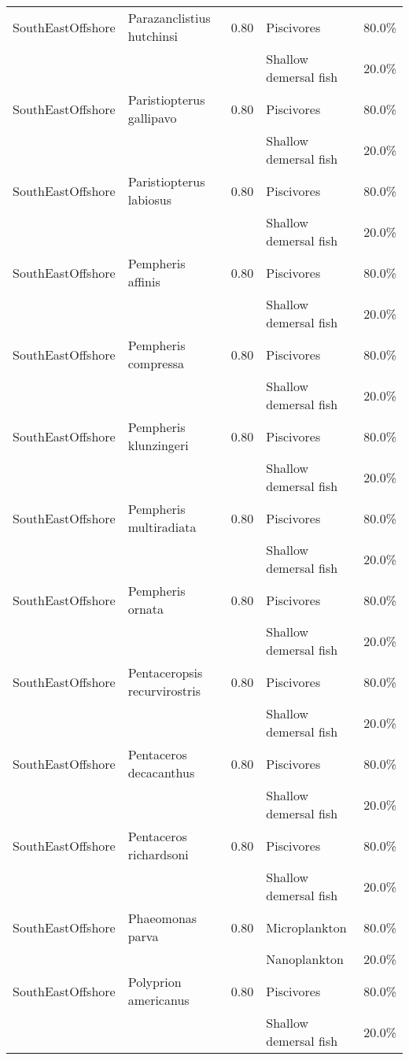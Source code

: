 \begin{longtable}{llcll}
\hline
SouthEastOffshore & Parazanclistius hutchinsi & 0.80 & Piscivores & 80.0\% \\
& & & Shallow demersal fish & 20.0\% \\
\hline
SouthEastOffshore & Paristiopterus gallipavo & 0.80 & Piscivores & 80.0\% \\
& & & Shallow demersal fish & 20.0\% \\
\hline
SouthEastOffshore & Paristiopterus labiosus & 0.80 & Piscivores & 80.0\% \\
& & & Shallow demersal fish & 20.0\% \\
\hline
SouthEastOffshore & Pempheris affinis & 0.80 & Piscivores & 80.0\% \\
& & & Shallow demersal fish & 20.0\% \\
\hline
SouthEastOffshore & Pempheris compressa & 0.80 & Piscivores & 80.0\% \\
& & & Shallow demersal fish & 20.0\% \\
\hline
SouthEastOffshore & Pempheris klunzingeri & 0.80 & Piscivores & 80.0\% \\
& & & Shallow demersal fish & 20.0\% \\
\hline
SouthEastOffshore & Pempheris multiradiata & 0.80 & Piscivores & 80.0\% \\
& & & Shallow demersal fish & 20.0\% \\
\hline
SouthEastOffshore & Pempheris ornata & 0.80 & Piscivores & 80.0\% \\
& & & Shallow demersal fish & 20.0\% \\
\hline
SouthEastOffshore & Pentaceropsis recurvirostris & 0.80 & Piscivores & 80.0\% \\
& & & Shallow demersal fish & 20.0\% \\
\hline
SouthEastOffshore & Pentaceros decacanthus & 0.80 & Piscivores & 80.0\% \\
& & & Shallow demersal fish & 20.0\% \\
\hline
SouthEastOffshore & Pentaceros richardsoni & 0.80 & Piscivores & 80.0\% \\
& & & Shallow demersal fish & 20.0\% \\
\hline
SouthEastOffshore & Phaeomonas parva & 0.80 & Microplankton & 80.0\% \\
& & & Nanoplankton & 20.0\% \\
\hline
SouthEastOffshore & Polyprion americanus & 0.80 & Piscivores & 80.0\% \\
& & & Shallow demersal fish & 20.0\% \\

\end{longtable}
